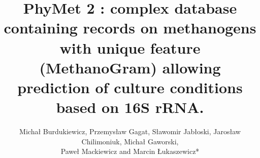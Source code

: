 \documentclass[final]{beamer}
\begin{document}
\date{}
\author{\large Micha\l{} Burdukiewicz, Przemys\l{}aw Gagat, S\l{}awomir Jab\l{}o\n{}ski, Jaros\l{}aw Chilimoniuk, Micha\l{} Gaworski, \\ Pawe\l{} Mackiewicz and Marcin \L{}ukaszewicz*\\
}

\title{\huge PhyMet 2 : complex database containing records on methanogens with unique feature (MethanoGram) allowing prediction of culture conditions based on 16S rRNA.}
\end{document}
